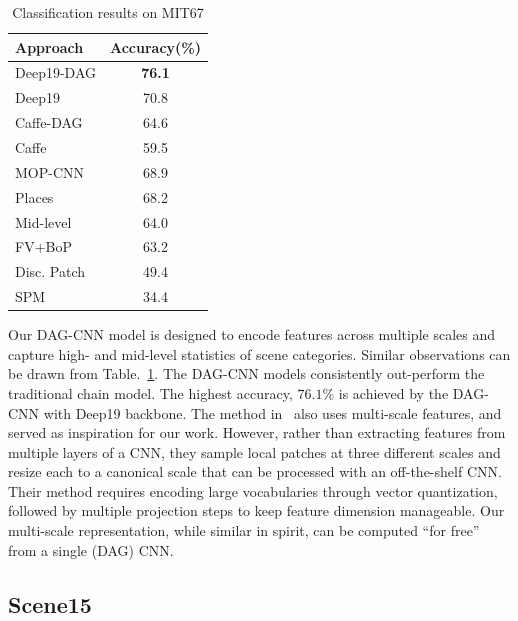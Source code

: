 \documentclass[10pt,twocolumn,letterpaper]{article}
\begin{document}
\begin{table}[htbp]
\begin{center}
\begin{tabular}{|l|c|}
\hline
Approach & Accuracy(\%) \\
\hline
Deep19-DAG & \textbf{76.1} \\
Deep19~\cite{veryDeep} & 70.8 \\
Caffe-DAG & 64.6	\\
Caffe~\cite{Caffe} & 59.5 \\ \hline
MOP-CNN~\cite{Gong14} & 68.9 \\
Places~\cite{zhoulearning}	& 68.2	\\
Mid-level~\cite{mid_level} & 64.0	\\
FV+BoP~\cite{FV_BoP} & 63.2 \\
Disc. Patch~\cite{disc_patch} & 49.4 \\
SPM~\cite{spatial_pyramid} & 34.4	\\
\hline
\end{tabular}
\end{center}
\caption{Classification results on MIT67}
\label{table:MIT67}
\end{table}

Our DAG-CNN model is designed to encode features across multiple scales and capture high- and mid-level statistics of scene categories. Similar observations can be drawn from Table.~\ref{table:MIT67}. The DAG-CNN models consistently out-perform the traditional chain model. The highest accuracy, $76.1\%$ is achieved by the DAG-CNN with Deep19 backbone. The method in~\cite{Gong14} also uses multi-scale features, and served as inspiration for our work. However, rather than extracting features from multiple layers of a CNN, they sample local patches at three different scales and resize each to a canonical scale that can be processed with an off-the-shelf CNN. Their method requires encoding large vocabularies through vector quantization, followed by multiple projection steps to keep feature dimension manageable. Our multi-scale representation, while similar in spirit, can be computed ``for free'' from a single (DAG) CNN.


\subsection{Scene15}
\end{document}
